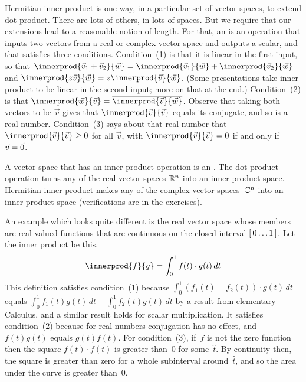 Hermitian inner product is one way, in a particular set of vector spaces, 
to extend dot product.
There are lots of others, in lots of spaces.
But we require that our extensions lead to a reasonable notion of length.
For that,
an  is an operation
that inputs two vectors from a real or complex vector space 
and outputs a scalar, and that
satisfies three conditions.
Condition~(1) is that it is linear in the first input, so that
$\innerprod{\vec{v}_1+\vec{v}_2}{\vec{w}}
 = \innerprod{\vec{v}_1}{\vec{w}}
   +\innerprod{\vec{v}_2}{\vec{w}}$
and $\innerprod{z\vec{v}}{\vec{w}}
     =z\innerprod{\vec{v}}{\vec{w}}$.
(Some presentations take inner product 
to be linear in the second input; more on that
at the end.)
Condition~(2) is that
$\innerprod{\vec{w}}{\vec{v}}=\compconj{\innerprod{\vec{v}}{\vec{w}}}$.
Observe that taking both vectors to be 
$\vec{v}$ gives that $\innerprod{\vec{v}}{\vec{v}}$ equals its conjugate, and
so is a real number.
Condition~(3) says about that real number that
$\innerprod{\vec{v}}{\vec{v}}\geq 0$ for all $\vec{v}$, with 
$\innerprod{\vec{v}}{\vec{v}}= 0$ if and only if $\vec{v}=\vec{0}$.

A vector space that has an inner product operation is an
.
The dot product operation turns any of the real vector spaces $\mathbb{R}^n$ into
an inner product space. 
Hermitian inner product makes any of the complex vector spaces~$\mathbb{C}^n$ into 
an inner product space (verifications are in the exercises).

An example which looks quite different 
is the real vector space whose members are
real valued functions that are continuous on the 
closed interval $[\,0\ldots 1\,]$.
Let the inner product be this.
\begin{equation*}
  \innerprod{f}{g}=\int_{0}^1 f(t)\cdot g(t)\,dt
\end{equation*}
This definition satisfies
condition~(1) because  
$\int_{0}^1 (f_1(t)+f_2(t))\cdot g(t)\,dt$ equals 
$\int_{0}^1 f_1(t)g(t)\,dt+\int_{0}^1 f_2(t)g(t)\,dt$
by a result from elementary Calculus,
and a similar result holds for scalar multiplication. 
It satisfies condition~(2) because for real numbers conjugation has no effect,
and $f(t)g(t)$ equals $g(t)f(t)$. 
For condition~(3), if~$f$ is not the zero function then 
the square $f(t)\cdot f(t)$ is greater than~$0$ for some~$\hat{t}$.
By continuity then, the square is greater than zero for a whole subinterval
around~$\hat{t}$,
and so the area under the curve is greater than~$0$.

